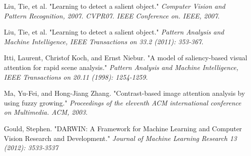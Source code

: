 \documentclass[10pt,twocolumn,letterpaper]{article}
\begin{document}
\begin{thebibliography}{99} \fontsize{9pt}{50} \setlength{\itemsep}{-0.5pt} 
     Liu, Tie, et al. "Learning to detect a salient object." 
        \textit{Computer Vision and Pattern Recognition, 2007. CVPR07. IEEE Conference on. IEEE, 2007}.

     Liu, Tie, et al. "Learning to detect a salient object." 
        \textit{Pattern Analysis and Machine Intelligence, IEEE Transactions on 33.2 (2011): 353-367}. 

     Itti, Laurent, Christof Koch, and Ernst Niebur. "A model of saliency-based visual attention for rapid scene analysis."
        \textit{Pattern Analysis and Machine Intelligence, IEEE Transactions on 20.11 (1998): 1254-1259}.

     Ma, Yu-Fei, and Hong-Jiang Zhang. "Contrast-based image attention analysis by using fuzzy growing."
        \textit{ Proceedings of the eleventh ACM international conference on Multimedia. ACM, 2003}. 

     Gould, Stephen. "DARWIN: A Framework for Machine Learning and Computer Vision Research and Development." 
        \textit{Journal of Machine Learning Research 13 (2012): 3533-3537}

\end{thebibliography}
\end{document}
